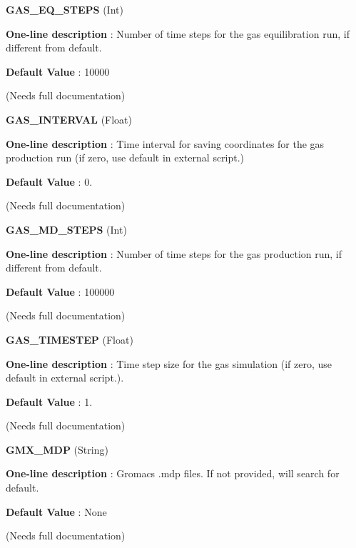\begin{DoxyItemize}
\item {\bfseries  G\-A\-S\-\_\-\-E\-Q\-\_\-\-S\-T\-E\-P\-S } (Int) \par
{\bfseries  One-\/line description }\-: Number of time steps for the gas equilibration run, if different from default. \par
{\bfseries  Default Value }\-: 10000 \par
(Needs full documentation)\end{DoxyItemize}
\begin{DoxyItemize}
\item {\bfseries  G\-A\-S\-\_\-\-I\-N\-T\-E\-R\-V\-A\-L } (Float) \par
{\bfseries  One-\/line description }\-: Time interval for saving coordinates for the gas production run (if zero, use default in external script.) \par
{\bfseries  Default Value }\-: 0. \par
(Needs full documentation)\end{DoxyItemize}
\begin{DoxyItemize}
\item {\bfseries  G\-A\-S\-\_\-\-M\-D\-\_\-\-S\-T\-E\-P\-S } (Int) \par
{\bfseries  One-\/line description }\-: Number of time steps for the gas production run, if different from default. \par
{\bfseries  Default Value }\-: 100000 \par
(Needs full documentation)\end{DoxyItemize}
\begin{DoxyItemize}
\item {\bfseries  G\-A\-S\-\_\-\-T\-I\-M\-E\-S\-T\-E\-P } (Float) \par
{\bfseries  One-\/line description }\-: Time step size for the gas simulation (if zero, use default in external script.). \par
{\bfseries  Default Value }\-: 1. \par
(Needs full documentation)\end{DoxyItemize}
\begin{DoxyItemize}
\item {\bfseries  G\-M\-X\-\_\-\-M\-D\-P } (String) \par
{\bfseries  One-\/line description }\-: Gromacs .mdp files. If not provided, will search for default. \par
{\bfseries  Default Value }\-: None \par
(Needs full documentation)\end{DoxyItemize}
